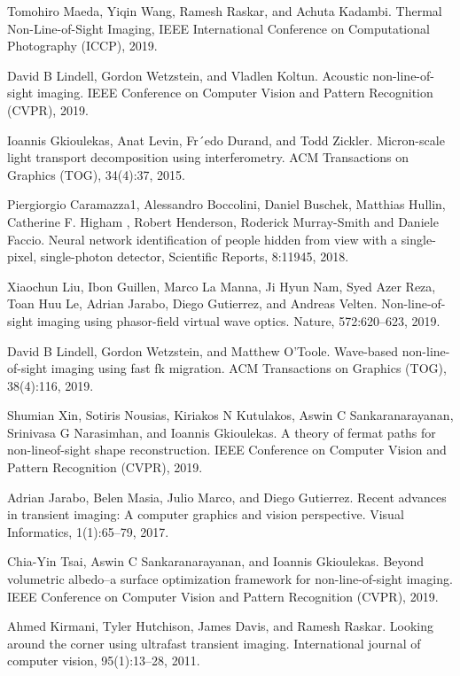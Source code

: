 \documentclass[10pt,journal,compsoc]{IEEEtran}
\begin{document}
\begin{thebibliography}{70}
 Tomohiro Maeda, Yiqin Wang, Ramesh Raskar, and Achuta Kadambi. Thermal Non-Line-of-Sight Imaging, IEEE International Conference on Computational Photography (ICCP), 2019.

 David B Lindell, Gordon Wetzstein, and Vladlen Koltun. Acoustic non-line-of-sight imaging. IEEE Conference on Computer Vision and Pattern Recognition (CVPR), 2019.

 Ioannis Gkioulekas, Anat Levin, Fr´edo Durand, and Todd Zickler. Micron-scale light transport decomposition using interferometry. ACM Transactions on Graphics (TOG), 34(4):37, 2015.

 Piergiorgio Caramazza1, Alessandro Boccolini, Daniel Buschek, Matthias Hullin, Catherine F. Higham , Robert Henderson, Roderick Murray-Smith and Daniele Faccio. Neural network identification of people hidden from view with a single-pixel, single-photon detector, Scientific Reports, 8:11945, 2018.

 Xiaochun Liu, Ibon Guillen, Marco La Manna, Ji Hyun Nam, Syed Azer Reza, Toan Huu Le, Adrian Jarabo, Diego Gutierrez, and Andreas Velten. Non-line-of-sight imaging
using phasor-field virtual wave optics. Nature, 572:620–623, 2019.

 David B Lindell, Gordon Wetzstein, and Matthew O’Toole. Wave-based non-line-of-sight imaging using fast fk migration. ACM Transactions on Graphics (TOG), 38(4):116, 2019.

 Shumian Xin, Sotiris Nousias, Kiriakos N Kutulakos, Aswin C Sankaranarayanan, Srinivasa G Narasimhan, and Ioannis Gkioulekas. A theory of fermat paths for non-lineof-sight shape reconstruction. IEEE Conference on Computer Vision and Pattern Recognition (CVPR), 2019.

 Adrian Jarabo, Belen Masia, Julio Marco, and Diego Gutierrez. Recent advances in transient imaging: A computer graphics and vision perspective. Visual Informatics, 1(1):65–79, 2017.

 Chia-Yin Tsai, Aswin C Sankaranarayanan, and Ioannis Gkioulekas. Beyond volumetric albedo–a surface optimization framework for non-line-of-sight imaging. IEEE Conference on Computer Vision and Pattern Recognition (CVPR), 2019.

 Ahmed Kirmani, Tyler Hutchison, James Davis, and Ramesh Raskar. Looking around the corner using ultrafast transient imaging. International journal of computer vision, 95(1):13–28, 2011.


\end{thebibliography}
\end{document}
